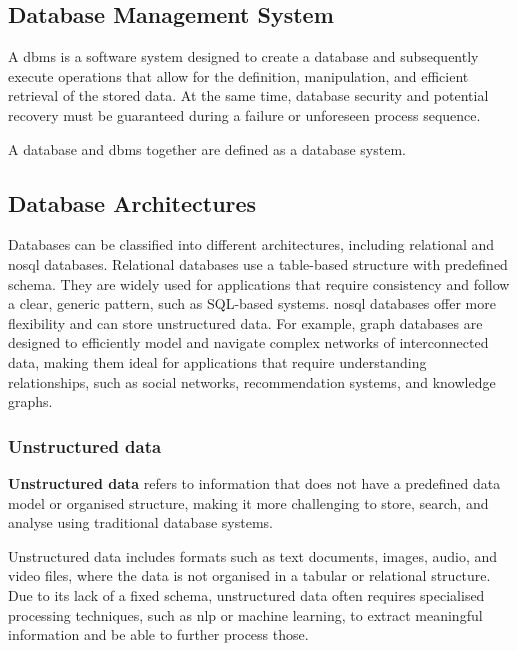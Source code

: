 \begin{definition}
\section{Database Management System}\label{sec:Database Management System}
\begin{definition}\label{def:Database Management System}
    A \ac{dbms}  is a software system designed to create a database and subsequently execute operations that allow for the definition, manipulation, and efficient retrieval of the stored data. 
    At the same time, database security and potential recovery must be guaranteed during a failure or unforeseen process sequence. \citep{limited2010introduction}
\end{definition}
A database and \ac{dbms} together are defined as a database system.  

\subsection{Database Architectures}\label{sec:database-architectures}
Databases can be classified into different architectures, including relational and \ac{nosql} databases. 
Relational databases use a table-based structure with predefined schema. 
They are widely used for applications that require consistency and follow a clear, generic pattern, such as SQL-based systems.
\ac{nosql} databases offer more flexibility and can store unstructured data. 
For example, graph databases are designed to efficiently model and navigate complex networks of interconnected data, making them ideal for applications that require understanding relationships, such as social networks, recommendation systems, and knowledge graphs.
\subsubsection{Unstructured data}\label{sec:unstructured-data}
\begin{definition}\label{def:unstructured-data}
    \textbf{Unstructured data} refers to information that does not have a predefined data model or organised structure, making it more challenging to store, search, and analyse using traditional database systems.
\end{definition}
Unstructured data includes formats such as text documents, images, audio, and video files, where the data is not organised in a tabular or relational structure. 
Due to its lack of a fixed schema, unstructured data often requires specialised processing techniques, such as \ac{nlp} or machine learning, to extract meaningful information and be able to further process those.

\end{definition}
